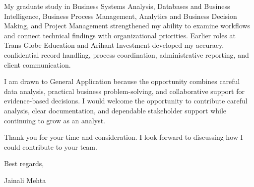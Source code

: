 \documentclass[letterpaper,11pt]{article}
\begin{document}
\bigbreak
My graduate study in Business Systems Analysis, Databases and Business Intelligence, Business Process Management, Analytics and Business Decision Making, and Project Management strengthened my ability to examine workflows and connect technical findings with organizational priorities. Earlier roles at Trans Globe Education and Arihant Investment developed my accuracy, confidential record handling, process coordination, administrative reporting, and client communication.

\bigbreak
I am drawn to General Application because the opportunity combines careful data analysis, practical business problem-solving, and collaborative support for evidence-based decisions. I would welcome the opportunity to contribute careful analysis, clear documentation, and dependable stakeholder support while continuing to grow as an analyst.

\bigbreak
Thank you for your time and consideration. I look forward to discussing how I could contribute to your team.

\bigbreak
Best regards,

\bigbreak
Jainali Mehta
\end{document}
